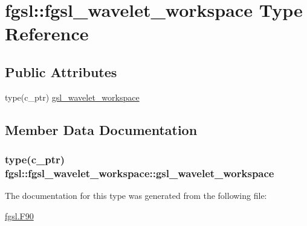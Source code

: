 \hypertarget{structfgsl_1_1fgsl__wavelet__workspace}{\section{fgsl\-:\-:fgsl\-\_\-wavelet\-\_\-workspace Type Reference}
\label{structfgsl_1_1fgsl__wavelet__workspace}
}
\subsection*{Public Attributes}
\begin{DoxyCompactItemize}
\item 
type(c\-\_\-ptr) \hyperlink{structfgsl_1_1fgsl__wavelet__workspace_ae698b882f223dc47c238e1930e55a748}{gsl\-\_\-wavelet\-\_\-workspace}
\end{DoxyCompactItemize}


\subsection{Member Data Documentation}
\hypertarget{structfgsl_1_1fgsl__wavelet__workspace_ae698b882f223dc47c238e1930e55a748}{
\subsubsection[{gsl\-\_\-wavelet\-\_\-workspace}]{\setlength{\rightskip}{0pt plus 5cm}type(c\-\_\-ptr) fgsl\-::fgsl\-\_\-wavelet\-\_\-workspace\-::gsl\-\_\-wavelet\-\_\-workspace}}\label{structfgsl_1_1fgsl__wavelet__workspace_ae698b882f223dc47c238e1930e55a748}


The documentation for this type was generated from the following file\-:\begin{DoxyCompactItemize}
\item 
\hyperlink{fgsl_8F90}{fgsl.\-F90}\end{DoxyCompactItemize}

